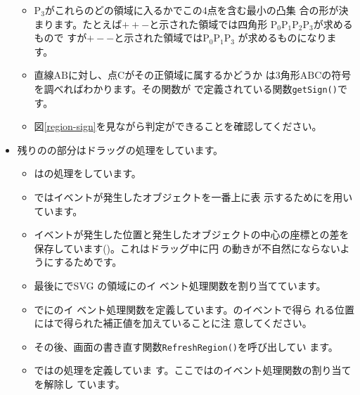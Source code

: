 \begin{itemize}
\begin{itemize}
 \item $\textrm{P}_3$がこれらのどの領域に入るかでこの4点を含む最小の凸集
       合の形が決まります。たとえば$++-$と示された領域では四角形
       $\textrm{P}_0\textrm{P}_1\textrm{P}_2\textrm{P}_3$が求めるもので
       すが$+--$と示された領域では$\textrm{P}_0\textrm{P}_1\textrm{P}_3$
       が求めるものになります。
 \item 直線$\textrm{AB}$に対し、点$\textrm{C}$がその正領域に属するかどうか
       は3角形$\textrm{ABC}$の符号を調べればわかります。その関数が
       で定義されている関数\texttt{getSign()}です。
 \item 図\ref{region-sign}を見ながら判定ができることを確認してください。
\end{itemize}
 \item 残りの\JS の部分はドラッグの処理をしています。
\begin{itemize}
 \item {}はの処理をしています。
 \item {}ではイベントが発生したオブジェクトを一番上に表
       示するためにを用いています。
 \item イベントが発生した位置と発生したオブジェクトの中心の座標との差を
       保存しています()。これはドラッグ中に円
       の動きが不自然にならないようにするためです。
 \item 最後にでSVG の領域にのイ
       ベント処理関数を割り当てています。
 \item {}でにのイ
       ベント処理関数を定義しています。のイベントで得ら
       れる位置にはで得られた補正値を加えていることに注
       意してください。
 \item その後、画面の書き直す関数\texttt{RefreshRegion()}を呼び出してい
       ます。
 \item {}ではの処理を定義していま
       す。ここではのイベント処理関数の割り当てを解除し
       ています。
\end{itemize}
\end{itemize}

\fi
